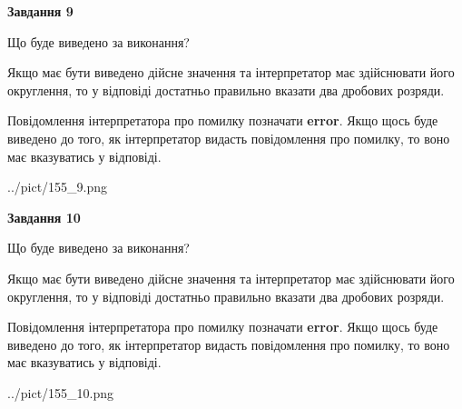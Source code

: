 \documentclass[12pt, ukrainian]{article}
\begin{document}
{\begin {Large}
{\begin {center}\textbf{Завдання 9}\end {center}}\par
Що буде виведено за виконання? \par

Якщо має бути виведено дійсне значення та інтерпретатор має здійснювати його округлення, 
то у відповіді достатньо правильно вказати два дробових розряди.

Повідомлення інтерпретатора про помилку позначати \textbf{error}.
Якщо щось буде виведено до того, як інтерпретатор видасть повідомлення про помилку, 
то воно має вказуватись у відповіді. \par

\begin{center}
	{../pict/155_9.png}
\end{center}
\newpage

{\begin {center}\textbf{Завдання 10}\end {center}}\par
Що буде виведено за виконання? \par

Якщо має бути виведено дійсне значення та інтерпретатор має здійснювати його округлення, 
то у відповіді достатньо правильно вказати два дробових розряди.

Повідомлення інтерпретатора про помилку позначати \textbf{error}.
Якщо щось буде виведено до того, як інтерпретатор видасть повідомлення про помилку, 
то воно має вказуватись у відповіді. \par

\begin{center}
	{../pict/155_10.png}
\end{center}
\newpage

\end {Large}}
\end{document}

